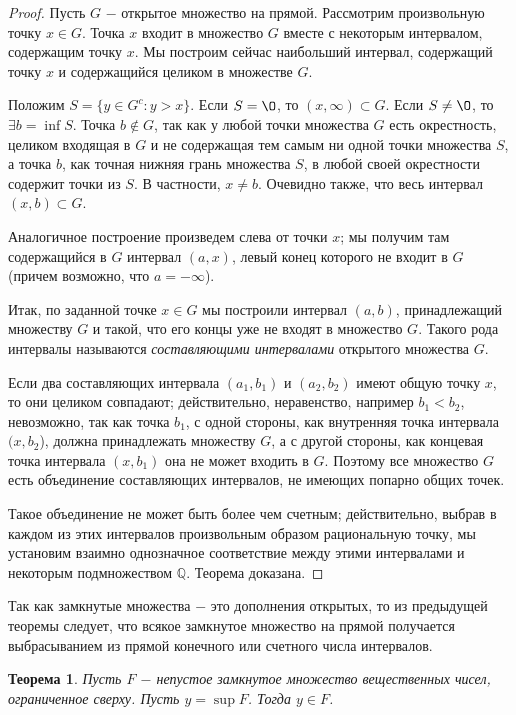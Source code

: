 \documentclass{article}
\newtheorem{theorem}{Теорема}[section]
\begin{document}
\begin{proof}
Пусть \(G\) \(-\) открытое множество на прямой. Рассмотрим произвольную точку \(x \in G\). Точка \(x\) входит в множество \(G\) вместе с некоторым интервалом, содержащим точку \(x\). Мы построим сейчас наибольший интервал, содержащий точку \(x\) и содержащийся целиком в множестве \(G\).

Положим \(S = \{y \in G^c : y > x\}\). Если \(S = \O\), то \((x, \infty) \subset G\). Если \(S \neq \O\), то \(\exists b = \inf S\). Точка \(b \notin G\), так как у любой точки множества \(G\) есть окрестность, целиком входящая в \(G\) и не содержащая тем самым ни одной точки множества \(S\), а точка \(b\), как точная нижняя грань множества \(S\), в любой своей окрестности содержит точки из \(S\). В частности, \(x \neq b\). Очевидно также, что весь интервал \((x, b) \subset G\).

Аналогичное построение произведем слева от точки \(x\); мы получим там содержащийся в \(G\) интервал \((a, x)\), левый конец которого не входит в \(G\) (причем возможно, что \(a = - \infty\)).

Итак, по заданной точке \(x \in G\) мы построили интервал \((a, b)\), принадлежащий множеству \(G\) и такой, что его концы уже не входят в множество \(G\). Такого рода интервалы называются \textit{составляющими интервалами} открытого множества \(G\).

Если два составляющих интервала \((a_1, b_1)\) и \((a_2, b_2)\) имеют общую точку \(x\), то они целиком совпадают; действительно, неравенство, например \(b_1 < b_2\), невозможно, так как точка \(b_1\), с одной стороны, как внутренняя точка интервала \((x, b_2\)), должна принадлежать множеству \(G\), а с другой стороны, как концевая точка интервала \((x, b_1)\) она не может входить в \(G\). Поэтому все множество \(G\) есть объединение составляющих интервалов, не имеющих попарно общих точек.

Такое объединение не может быть более чем счетным; действительно, выбрав в каждом из этих интервалов произвольным образом рациональную точку, мы установим взаимно однозначное соответствие между этими интервалами и некоторым подмножеством \(\mathbb{Q}\). Теорема доказана.
\end{proof}

Так как замкнутые множества \(-\) это дополнения открытых, то из предыдущей теоремы следует, что всякое замкнутое множество на прямой получается выбрасыванием из прямой конечного или счетного числа интервалов.

\begin{theorem}
Пусть \(F\) \(-\) непустое замкнутое множество вещественных чисел, ограниченное сверху. Пусть \(y = \sup F\). Тогда \(y \in F\).
\end{theorem}
\end{document}

